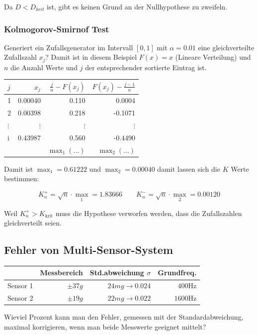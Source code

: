 Da $D < D_{krit}$ ist, gibt es keinen Grund an der Nullhypothese zu zweifeln.

\subsubsection{Kolmogorov-Smirnof Test}\label{Kolmogorov}
Generiert ein Zufallsgenerator im Intervall $[0, 1]$ mit $\alpha=0.01$ eine gleichverteilte Zufallszahl $x_j$? Damit ist in diesem Beispiel $F(x) = x$ (Lineare Verteilung) und $n$ die Anzahl Werte und $j$ der entsprechender sortierte Eintrag ist.
\begin{center}
	\begin{tabular}{l|r|r|r}
		$j$ & $x_j$ & $\frac{j}{n}-F(x_j)$ & $F(x_j) - \frac{j-1}{n}$ \\ \toprule
		1 & 0.00040 & 0.110 & 0.0004  \\  \midrule
		2& 0.00398 & 0.218 & -0.1071 \\  \midrule
		$\vdots$ & $\vdots$& $\vdots$& $\vdots$ \\  \midrule
		i & 0.43987 & 0.560 &-0.4490 \\ \bottomrule
		& & $\max_1(\dots)$ & $\max_2(\dots)$
	\end{tabular}
\end{center}

Damit ist $\max_1 = 0.61222$ und  $\max_2 = 0.00040$ damit lassen sich die $K$ Werte bestimmen:

\[
K_n^+ = \sqrt{n}\cdot \max_1 = 1.83666 \qquad K_n^- = \sqrt{n}\cdot \max_2 = 0.00120
\]

Weil $K_n^+ > K_\text{krit}$ muss die Hypothese verworfen werden, dass die Zufallszahlen gleichverteilt seien.


\subsection{Fehler von Multi-Sensor-System}
\begin{center}
	\begin{tabular}{l|r|r|r}
		& Messbereich & Std.abweichung $\sigma$ & Grundfreq. \\ \toprule
		Sensor 1 & $\pm37g$ & $24mg \rightarrow 0.024$ & $400$Hz  \\  \midrule
		Sensor 2 & $\pm19g$ & $22mg \rightarrow 0.022$ & $1600$Hz \\  \midrule
	\end{tabular}
\end{center}
Wieviel Prozent kann man den Fehler, gemessen mit der Standardabweichung, maximal korrigieren, wenn man beide Messwerte geeignet mittelt?

